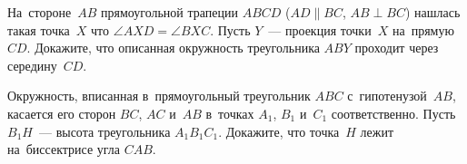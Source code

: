 \begin{problems}
\item
На~стороне~$AB$ прямоугольной трапеции $ABCD$
($AD \parallel BC$, $AB \perp BC$) нашлась такая точка~$X$ что
$\angle AXD = \angle BXC$.
Пусть $Y$~--- проекция точки~$X$ на~прямую~$CD$.
Докажите, что описанная окружность треугольника $ABY$ проходит через
середину~$CD$.

\item
Окружность, вписанная в~прямоугольный треугольник $ABC$ с~гипотенузой~$AB$,
касается его сторон $BC$, $AC$ и~$AB$ в~точках $A_{1}$, $B_{1}$ и~$C_{1}$
соответственно.
Пусть $B_{1}H$~--- высота треугольника $A_{1}B_{1}C_{1}$.
Докажите, что точка~$H$ лежит на~биссектрисе угла $CAB$.

\end{problems}

